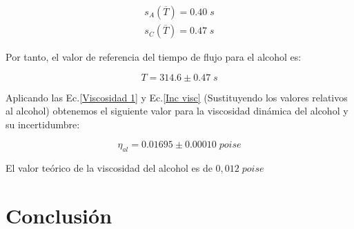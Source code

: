 \documentclass[a4paper,12pt,titlepage]{article}
\begin{document}
\begin{equation}
    \begin{gathered}
        s_A(\overline{T}) = 0.40 \; s \\
        s_C(\overline{T}) = 0.47 \; s
    \end{gathered}
\end{equation}

Por tanto, el valor de referencia del tiempo de flujo para el alcohol es:

\begin{equation}
    T = 314.6 \pm 0.47 \; s
\end{equation}

Aplicando las Ec.\ref{Viscosidad 1} y Ec.\ref{Inc visc} (Sustituyendo los valores relativos al alcohol) obtenemos el siguiente valor para la viscosidad dinámica del alcohol y su incertidumbre:

\begin{equation}
    \eta_{al} =  0.01695 \pm 0.00010 \; poise
\end{equation}

El valor teórico de la viscosidad del alcohol es de $0,012 \; poise$ 

\section{Conclusión}
\end{document}
